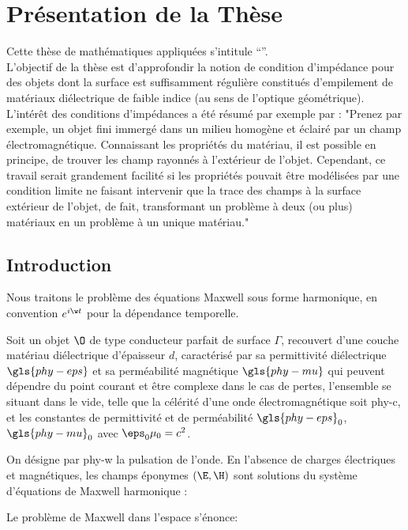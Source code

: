 \section*{Présentation de la Thèse}\label{pre_th}
Cette thèse de mathématiques appliquées s'intitule ``\doctitle''.\\

L'objectif de la thèse est d’approfondir la notion de condition d'impédance pour des objets dont la surface est suffisamment régulière constitués d'empilement de matériaux diélectrique de faible indice (au sens de l'optique géométrique).\\

L’intérêt des conditions d'impédances a été résumé par exemple par \cite{senior_approximate_1995}: "Prenez par exemple, un objet fini immergé dans un milieu homogène et éclairé par un champ électromagnétique. Connaissant les propriétés du matériau, il est possible en principe, de trouver les champ rayonnés à l'extérieur de l'objet. Cependant, ce travail serait grandement facilité si les propriétés pouvait être modélisées par une condition limite ne faisant intervenir que la trace des champs à la surface extérieur de l'objet, de fait, transformant un problème à deux (ou plus) matériaux en un problème à un unique matériau."

\subsection*{Introduction}
Nous traitons le problème des équations Maxwell sous forme harmonique, en convention $e^{i\w t}$ pour la dépendance temporelle.

Soit un objet $\O$ de type conducteur parfait de surface $\Gamma$, recouvert d'une couche matériau diélectrique d'épaisseur $d$, caractérisé par sa permittivité diélectrique $\gls{phy-eps}$ et sa perméabilité magnétique $\gls{phy-mu}$ qui peuvent dépendre du point courant et être complexe dans le cas de pertes, l'ensemble se situant dans le vide, telle que la célérité d'une onde électromagnétique soit \gls{phy-c}, et les constantes de permittivité et de perméabilité $\gls{phy-eps}_0$, $\gls{phy-mu}_0$ avec $\eps_0\mu_0 = c^{2}$.

On désigne par \gls{phy-w} la pulsation de l'onde. En l'absence de charges électriques et magnétiques, les champs éponymes $( \E, \H )$ sont solutions du système d'équations de Maxwell harmonique : 

Le problème de Maxwell dans l'espace s'énonce: \\

